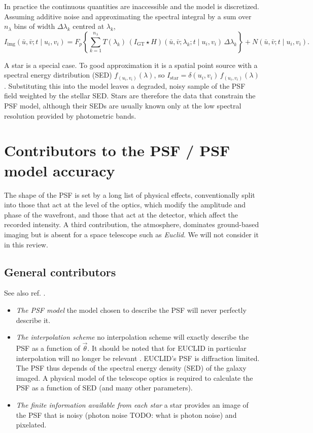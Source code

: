 \documentclass[11pt]{book}
\begin{document}
In practice the continuous quantities are inaccessible and the model is discretized. Assuming additive noise and approximating the spectral integral by a sum over $n_\lambda$ bins of width $\Delta\lambda_k$ centred at $\lambda_k$,
\begin{equation}
I_{\mathrm{img}}(\bar u,\bar v;t\mid u_i,v_i)
= F_p\!\left\{\sum_{k=1}^{n_\lambda} T(\lambda_k)\,(I_{\mathrm{GT}}\star H)(\bar u,\bar v;\lambda_k;t\mid u_i,v_i)\,\Delta\lambda_k\right\}
+ N(\bar u,\bar v;t\mid u_i,v_i).
\label{eq:obsmodel_discrete}
\end{equation}

A star is a special case. To good approximation it is a spatial point source with a spectral energy distribution (SED) $f_{(u_i,v_i)}(\lambda)$, so $I_{\mathrm{star}} = \delta(u_i,v_i)\,f_{(u_i,v_i)}(\lambda)$. Substituting this into the model leaves a degraded, noisy sample of the PSF field weighted by the stellar SED. Stars are therefore the data that constrain the PSF model, although their SEDs are usually known only at the low spectral resolution provided by photometric bands.

\section{Contributors to the PSF / PSF model accuracy}
\label{sec:contributors}

The shape of the PSF is set by a long list of physical effects, conventionally split into those that act at the level of the optics, which modify the amplitude and phase of the wavefront, and those that act at the detector, which affect the recorded intensity. A third contribution, the atmosphere, dominates ground-based imaging but is absent for a space telescope such as \textit{Euclid}. We will not consider it in this review.

\subsection{General contributors}
See also ref. \cite{2008A&A...484...67P}.
\begin{itemize}
	\item \textit{The PSF model} the model chosen to describe the PSF will never perfectly describe it.
	\item \textit{The interpolation scheme} no interpolation scheme will exactly describe the PSF as a function of $\vec \theta$. It should be noted that for EUCLID in particular interpolation will no longer be relevant \cite{2020A&A...635A.139E} . EUCLID's PSF is diffraction limited. The PSF thus depends of the spectral energy density (SED) of the galaxy imaged. A physical model of the telescope optics is required to calculate the PSF as a function of SED (and many other parameters). 
	\item \textit{The finite information available from each star} a star provides an image of the PSF that is noisy (photon noise TODO: what is photon noise) and pixelated.
\end{itemize}
\end{document}
